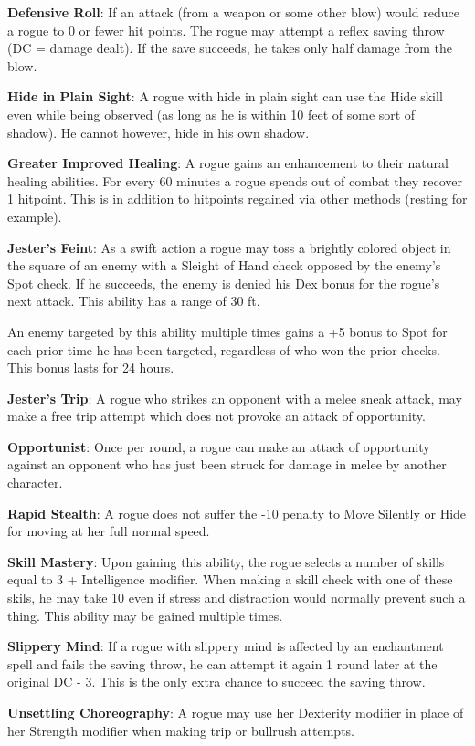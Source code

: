 \textbf{Defensive Roll}: If an attack (from a weapon or some other blow) would reduce a rogue to 0 or fewer hit points. The rogue may attempt a reflex saving throw (DC = damage dealt). If the save succeeds, he takes only half damage from the blow.

\textbf{Hide in Plain Sight}: A rogue with hide in plain sight can use the Hide skill even while being observed (as long as he is within 10 feet of some sort of shadow). He cannot however, hide in his own shadow.

\textbf{Greater Improved Healing}: A rogue gains an enhancement to their natural healing abilities. For every 60 minutes a rogue spends out of combat they recover 1 hitpoint. This is in addition to hitpoints regained via other methods (resting for example).

\textbf{Jester's Feint}: As a swift action a rogue may toss a brightly colored object in the square of an enemy with a Sleight of Hand check opposed by the enemy’s Spot check. If he succeeds, the enemy is denied his Dex bonus for the rogue’s next attack. This ability has a range of 30 ft.

An enemy targeted by this ability multiple times gains a +5 bonus to Spot for each prior time he has been targeted, regardless of who won the prior checks. This bonus lasts for 24 hours.

\textbf{Jester's Trip}: A rogue who strikes an opponent with a melee sneak attack, may make a free trip attempt which does not provoke an attack of opportunity.

\textbf{Opportunist}: Once per round, a rogue can make an attack of opportunity against an opponent who has just been struck for damage in melee by another character.

\textbf{Rapid Stealth}: A rogue does not suffer the -10 penalty to Move Silently or Hide for moving at her full normal speed.

\textbf{Skill Mastery}: Upon gaining this ability, the rogue selects a number of skills equal to 3 + Intelligence modifier. When making a skill check with one of these skils, he may take 10 even if stress and distraction would normally prevent such a thing. This ability may be gained multiple times.

\textbf{Slippery Mind}: If a rogue with slippery mind is affected by an enchantment spell and fails the saving throw, he can attempt it again 1 round later at the original DC - 3. This is the only extra chance to succeed the saving throw.

\textbf{Unsettling Choreography}: A rogue may use her Dexterity modifier in place of her Strength modifier when making trip or bullrush attempts.
